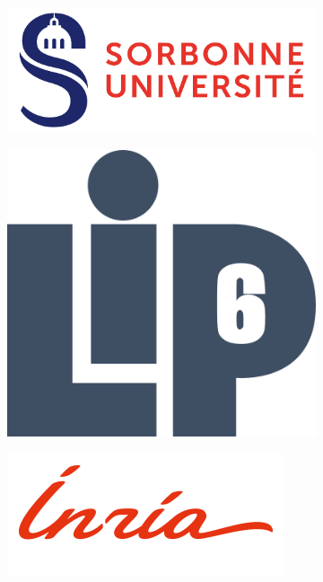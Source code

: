 \documentclass[a4paper,usenames,dvipsnames]{report}
\title{}
\begin{document}
\thispagestyle{empty}


\begin{figure}
  \begin{subfigure}{0.33\textwidth}
    \includegraphics[scale=.08]{./figures/Logo_Sorbonne_Universite.png}
  \end{subfigure}%
  \begin{subfigure}{0.33\textwidth}
    \hspace*{1.5cm}\includegraphics[scale=.3]{./figures/logo_lip6.png}
  \end{subfigure}%
  \begin{subfigure}{0.33\textwidth}
    \includegraphics[scale=.7]{./figures/inria_logo.png}
  \end{subfigure}
\end{figure}
\end{document}
